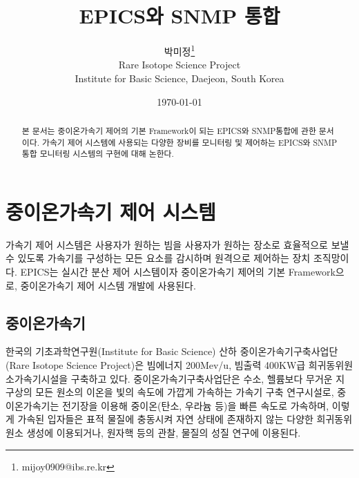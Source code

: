 \documentclass[11pt
  , a4paper
  , article
  , oneside
]{memoir}
\begin{document}
\newcommand{\technumber}{
  RAON Control-Document Series\\
  Revision : v0.1,   Release : Mar. 12. 2015}
\title{\textbf{EPICS와 SNMP 통합}}

\author{박미정\thanks{mijoy0909@ibs.re.kr} \\

  Rare Isotope Science Project\\
  Institute for Basic Science, Daejeon, South Korea
}
\date{\today}


\renewcommand{\maketitlehooka}{\begin{flushright}\textsf{\technumber}\end{flushright}}

\maketitle

\begin{abstract}
본 문서는 중이온가속기 제어의 기본 Framework이 되는 EPICS와 SNMP통합에 관한 문서이다. 가속기 제어 시스템에 사용되는 다양한 장비를 모니터링 및 제어하는 EPICS와 SNMP 통합 모니터링 시스템의 구현에 대해 논한다.
\end{abstract}

\chapter{중이온가속기 제어 시스템}
가속기 제어 시스템은 사용자가 원하는 빔을 사용자가 원하는 장소로 효율적으로 보낼 수 있도록 가속기를 구성하는 모든 요소를 감시하며 원격으로 제어하는 장치 조직망이다. EPICS는 실시간 분산 제어 시스템이자 중이온가속기 제어의 기본 Framework으로, 중이온가속기 제어 시스템 개발에 사용된다. 

\section{중이온가속기}
한국의 기초과학연구원(Institute for Basic Science) 산하 중이온가속기구축사업단(Rare Isotope Science Project)은 빔에너지 200Mev/u, 빔출력 400KW급 희귀동위원소가속기시설을 구축하고 있다\citep{raon}. 중이온가속기구축사업단은 수소, 헬륨보다 무거운 지구상의 모든 원소의 이온을 빛의 속도에 가깝게 가속하는 가속기 구축 연구시설로, 중이온가속기는 전기장을 이용해 중이온(탄소, 우라늄 등)을 빠른 속도로 가속하며, 이렇게 가속된 입자들은 표적 물질에 충동시켜 자연 상태에 존재하지 않는 다양한 희귀동위원소 생성에 이용되거나, 원자핵 등의 관찰, 물질의 성질 연구에 이용된다. 
\end{document}
